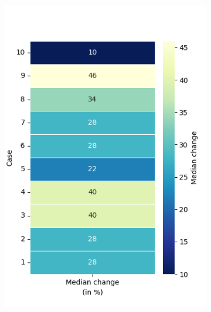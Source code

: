 \begin{figure}[h!]
\begin{subfigure}[t]{0.32\textwidth}
		\includegraphics[width=\textwidth]{Figures/SP_median_heatmap_percentage.png}
		\label{fig: SP_median}
		\caption{}
	\end{subfigure}
	\hfill
	\begin{subfigure}[t]{0.32\textwidth}
		\centering

\end{subfigure}
\end{figure}
